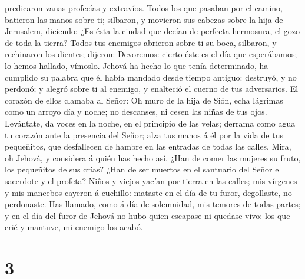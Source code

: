 predicaron vanas profecías y extravíos.  Todos los que
pasaban por el camino, batieron las manos sobre ti; silbaron, y movieron
sus cabezas sobre la hija de Jerusalem, diciendo: ¿Es ésta la ciudad que
decían de perfecta hermosura, el gozo de toda la tierra? 
Todos tus enemigos abrieron sobre ti su boca, silbaron, y rechinaron los
dientes; dijeron: Devoremos: cierto éste es el día que esperábamos; lo
hemos hallado, vímoslo.  Jehová ha hecho lo que tenía
determinado, ha cumplido su palabra que él había mandado desde tiempo
antiguo: destruyó, y no perdonó; y alegró sobre ti al enemigo, y
enalteció el cuerno de tus adversarios.  El corazón de
ellos clamaba al Señor: Oh muro de la hija de Sión, echa lágrimas como
un arroyo día y noche; no descanses, ni cesen las niñas de tus ojos.
 Levántate, da voces en la noche, en el principio de las
velas; derrama como agua tu corazón ante la presencia del Señor; alza
tus manos á él por la vida de tus pequeñitos, que desfallecen de hambre
en las entradas de todas las calles.  Mira, oh Jehová, y
considera á quién has hecho así. ¿Han de comer las mujeres su fruto, los
pequeñitos de sus crías? ¿Han de ser muertos en el santuario del Señor
el sacerdote y el profeta?  Niños y viejos yacían por
tierra en las calles; mis vírgenes y mis mancebos cayeron á cuchillo:
mataste en el día de tu furor, degollaste, no perdonaste. 
Has llamado, como á día de solemnidad, mis temores de todas partes; y en
el día del furor de Jehová no hubo quien escapase ni quedase vivo: los
que crié y mantuve, mi enemigo los acabó.

\hypertarget{section-2}{%
\section{3}\label{section-2}}

